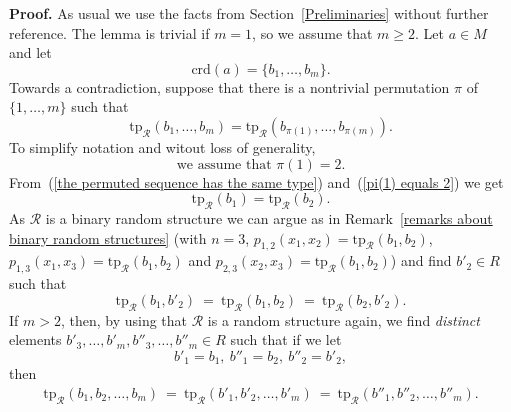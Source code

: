 \documentclass[11pt, twoside]{amsart}
\numberwithin{equation}{section}
\newcommand{\tp}{\mathrm{tp}}
\newcommand{\crd}{\mathrm{crd}}
\newcommand{\mcR}{\mathcal{R}}
\begin{document}
\noindent
{\bf Proof.}
As usual we use the facts from Section~\ref{Preliminaries} without further reference.
The lemma is trivial if $m = 1$, so we assume that $m \geq 2$.
Let $a \in M$ and let 
\[ \crd(a)  = \{b_1, \ldots, b_m\}. \]
Towards a contradiction, suppose that there is a nontrivial permutation $\pi$ of $\{1, \ldots, m\}$
such that 
\begin{equation}\label{the permuted sequence has the same type}
\tp_\mcR(b_1, \ldots, b_m) = \tp_\mcR(b_{\pi(1)}, \ldots, b_{\pi(m)}).
\end{equation}
To simplify notation and witout loss of generality,
\begin{equation}\label{pi(1) equals 2}
\text{ we assume that $\pi(1) = 2$. }
\end{equation}
From~(\ref{the permuted sequence has the same type}) and~(\ref{pi(1) equals 2}) we get
\[ \tp_\mcR(b_1) = \tp_\mcR(b_2). \]
As $\mcR$ is a binary random structure we can argue as in 
Remark~\ref{remarks about binary random structures}
(with $n = 3$, $p_{1, 2}(x_1, x_2) = \tp_\mcR(b_1, b_2)$, 
$p_{1, 3}(x_1, x_3) = \tp_\mcR(b_1, b_2)$ and $p_{2, 3}(x_2, x_3) = \tp_\mcR(b_1, b_2)$)
and find $b'_2 \in R$ such that 
\[ \tp_\mcR(b_1, b'_2) \ = \ \tp_\mcR(b_1, b_2) \ = \ \tp_\mcR(b_2, b'_2). \]
If $m > 2$, then, by using that $\mcR$ is a random structure again, we find 
{\em distinct} elements $b'_3, \ldots, b'_m, b''_3, \ldots, b''_m \in R$ such that if we let
\begin{equation}\label{identifications of elements}
b'_1 = b_1, \ b''_1 = b_2, \ b''_2 = b'_2,
\end{equation}
then
\begin{align}\label{the other sequences have the same type}
\tp_\mcR(b_1, b_2, \ldots, b_m) \ = \ 
\tp_\mcR(b'_1, b'_2, \ldots, b'_m) \ = \ 
\tp_\mcR(b''_1, b''_2, \ldots, b''_m). 
\end{align}
\end{document}
